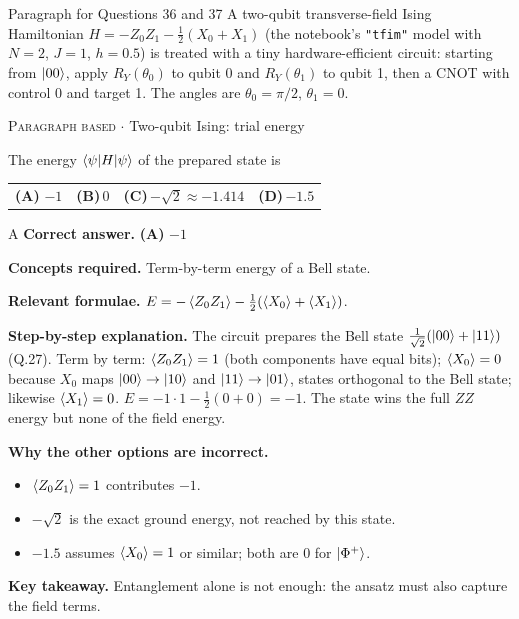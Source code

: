 \documentclass[11pt,a4paper]{article}
\newcommand{\optlabel}[1]{\textbf{(#1)}}
\newcommand{\correctlabel}[1]{\textcolor{okgreen}{\textbf{(#1)}\,\ding{51}}}
\newenvironment{qitem}[1]{\begin{list}{}{\setlength{\leftmargin}{3.3em}\setlength{\labelwidth}{3.1em}%
  \setlength{\labelsep}{0.2em}\setlength{\topsep}{3pt}\setlength{\parsep}{3pt}}\item[\textbf{Q.#1}\hfill]}{\end{list}}
\newcommand{\qsep}{\par\vspace{2pt}{\color{black!15}\hrule}\vspace{4pt}}
\newcommand{\qmeta}[2]{{\footnotesize\color{black!60}\textsc{#1} \;$\cdot$\; #2}\par}
\begin{document}
\begin{passagebox}{Paragraph for Questions 36 and 37}
A two-qubit transverse-field Ising Hamiltonian $H = -Z_0Z_1 - \tfrac12(X_0 + X_1)$ (the notebook's \texttt{"tfim"} model with $N = 2$,
$J = 1$, $h = 0.5$) is treated with a tiny hardware-efficient circuit: starting from $\ket{00}$, apply $R_Y(\theta_0)$ to qubit 0 and $R_Y(\theta_1)$
to qubit 1, then a CNOT with control 0 and target 1. The angles are $\theta_0 = \pi/2$, $\theta_1 = 0$.
\end{passagebox}
\begin{qitem}{36}
\qmeta{Paragraph based}{Two-qubit Ising: trial energy}
The energy $\braket{\psi|H|\psi}$ of the prepared state is
\par\smallskip\noindent\begin{tabularx}{\linewidth}{@{}*{4}{L}@{}}
\correctlabel{A}\,$-1$ & \optlabel{B}\,$0$ & \optlabel{C}\,$-\sqrt2 \approx -1.414$ & \optlabel{D}\,$-1.5$
\end{tabularx}
\end{qitem}
\begin{solbox}{A}
\textbf{\color{brand}Correct answer.} \textcolor{okgreen}{\textbf{(A)}} $-1$

\textbf{\color{brand}Concepts required.} Term-by-term energy of a Bell state.

\textbf{\color{brand}Relevant formulae.} $E = -\braket{Z_0Z_1} - \tfrac12(\braket{X_0} + \braket{X_1})$.

\textbf{\color{brand}Step-by-step explanation.} The circuit prepares the Bell state $\frac{1}{\sqrt2}(\ket{00} + \ket{11})$ (Q.27). Term by term: $\braket{Z_0Z_1} = 1$ (both components have equal bits);
$\braket{X_0} = 0$ because $X_0$ maps $\ket{00} \to \ket{10}$ and $\ket{11} \to \ket{01}$, states orthogonal to the Bell state; likewise $\braket{X_1} = 0$.
$E = -1\cdot1 - \tfrac12(0 + 0) = -1$. The state wins the full $ZZ$ energy but none of the field energy.

\textbf{\color{brand}Why the other options are incorrect.}
\begin{itemize}[leftmargin=2.4em, itemsep=1pt, topsep=2pt]
\item[\textbf{(B)}] $\braket{Z_0Z_1} = 1$ contributes $-1$.
\item[\textbf{(C)}] $-\sqrt2$ is the exact ground energy, not reached by this state.
\item[\textbf{(D)}] $-1.5$ assumes $\braket{X_0} = 1$ or similar; both are 0 for $\ket{\Phi^+}$.
\end{itemize}
\textbf{\color{brand}Key takeaway.} Entanglement alone is not enough: the ansatz must also capture the field terms.
\end{solbox}
\qsep
\end{document}

